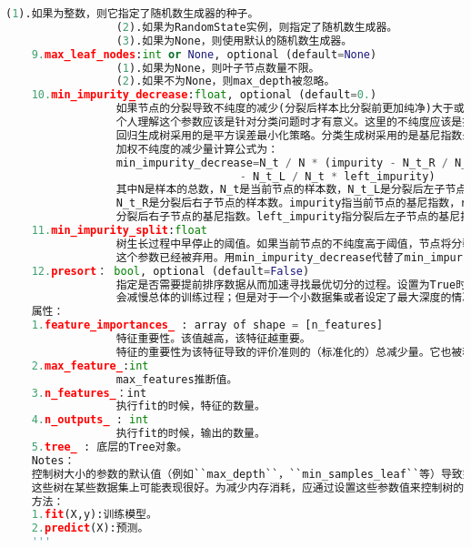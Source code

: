 \documentclass[18pt,a4paper,oneside,UTF8]{ctexart}
\begin{document}
\begin{lstlisting}[language=python]
                 (1).如果为整数，则它指定了随机数生成器的种子。
                 (2).如果为RandomState实例，则指定了随机数生成器。
                 (3).如果为None，则使用默认的随机数生成器。
    9.max_leaf_nodes:int or None, optional (default=None)
                 (1).如果为None，则叶子节点数量不限。
                 (2).如果不为None，则max_depth被忽略。
    10.min_impurity_decrease:float, optional (default=0.)
                 如果节点的分裂导致不纯度的减少(分裂后样本比分裂前更加纯净)大于或等于min_impurity_decrease，则分裂该节点。
                 个人理解这个参数应该是针对分类问题时才有意义。这里的不纯度应该是指基尼指数。
                 回归生成树采用的是平方误差最小化策略。分类生成树采用的是基尼指数最小化策略。
                 加权不纯度的减少量计算公式为：
                 min_impurity_decrease=N_t / N * (impurity - N_t_R / N_t * right_impurity
                                    - N_t_L / N_t * left_impurity)
                 其中N是样本的总数，N_t是当前节点的样本数，N_t_L是分裂后左子节点的样本数，
                 N_t_R是分裂后右子节点的样本数。impurity指当前节点的基尼指数，right_impurity指
                 分裂后右子节点的基尼指数。left_impurity指分裂后左子节点的基尼指数。
    11.min_impurity_split:float
                 树生长过程中早停止的阈值。如果当前节点的不纯度高于阈值，节点将分裂，否则它是叶子节点。
                 这个参数已经被弃用。用min_impurity_decrease代替了min_impurity_split。
    12.presort： bool, optional (default=False)
                 指定是否需要提前排序数据从而加速寻找最优切分的过程。设置为True时，对于大数据集
                 会减慢总体的训练过程；但是对于一个小数据集或者设定了最大深度的情况下，会加速训练过程。
    属性：
    1.feature_importances_ : array of shape = [n_features]
                 特征重要性。该值越高，该特征越重要。
                 特征的重要性为该特征导致的评价准则的（标准化的）总减少量。它也被称为基尼的重要性
    2.max_feature_:int
                 max_features推断值。
    3.n_features_：int
                 执行fit的时候，特征的数量。
    4.n_outputs_ : int
                 执行fit的时候，输出的数量。
    5.tree_ : 底层的Tree对象。
    Notes：
    控制树大小的参数的默认值（例如``max_depth``，``min_samples_leaf``等）导致完全成长和未剪枝的树，
    这些树在某些数据集上可能表现很好。为减少内存消耗，应通过设置这些参数值来控制树的复杂度和大小。
    方法：
    1.fit(X,y):训练模型。
    2.predict(X):预测。
    '''
     

\end{lstlisting}
\end{document}
